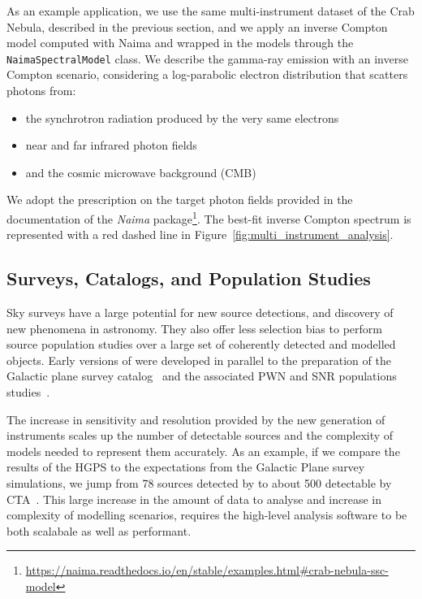 \documentclass[longauth]{aa}
\newcommand{\code}[1]{\texttt{#1}}
\begin{document}
As an example application, we use the same multi-instrument
dataset of the Crab Nebula, described in the previous section,
and we apply an inverse
Compton model computed with Naima and wrapped in the \gammapy models
through the \code{NaimaSpectralModel} class. We describe the gamma-ray emission 
with an inverse Compton scenario, considering a log-parabolic
electron distribution that scatters photons from:
%
\begin{itemize}
	\item the synchrotron radiation produced by
	the very same electrons
	\item near and far infrared photon fields
	\item and the cosmic microwave background (CMB)
\end{itemize}
%
We adopt the prescription on the target photon fields provided in the documentation of the \textit{Naima}
package\footnote{\url{https://naima.readthedocs.io/en/stable/examples.html\#crab-nebula-ssc-model}}.
The best-fit inverse Compton spectrum is represented with a red dashed line in
Figure~\ref{fig:multi_instrument_analysis}.

\subsection{Surveys, Catalogs, and Population Studies}
\label{ssec:surveys-catalogs-and-population-studies}

Sky surveys have a large potential for new source detections, and discovery of new phenomena
 in \gammaray astronomy. They also offer less selection bias to perform
source population studies over a large set of coherently detected and modelled objects.
Early versions of \gammapy were developed in parallel to the preparation of
the \hess Galactic plane survey catalog~\citep[HGPS, ][]{2018A&A...612A...1H} and
the associated PWN and SNR populations studies~\citep{2018A&A...612A...2H,
	2018A&A...612A...3H}. 

The increase in sensitivity and resolution provided by the new generation of
instruments scales up the number of detectable sources and the complexity of 
models needed to represent them accurately. As an example, if we compare the
results of the HGPS to the expectations from the \cta Galactic Plane survey
simulations, we jump from 78 sources detected by \hess to about 500 detectable by
CTA~\citep{2021arXiv210903729R}. This large increase in the amount of data to analyse
and increase in complexity of modelling scenarios, requires the high-level
analysis software to be both scalabale as well as performant. 
\end{document}
